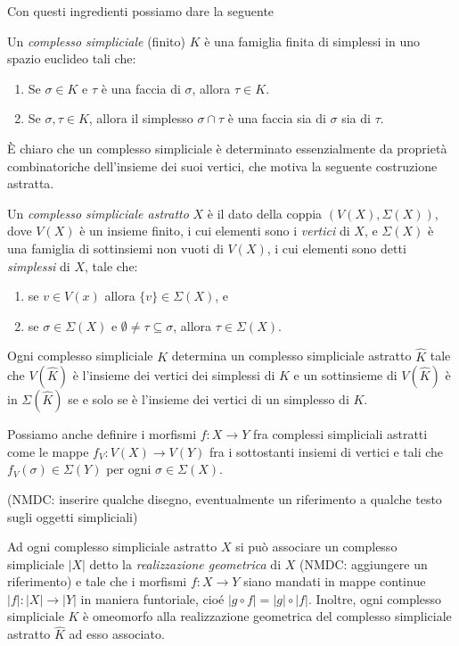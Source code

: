 Con questi ingredienti possiamo dare la seguente
\begin{defn}
Un \emph{complesso simpliciale} (finito) $K$ è una famiglia finita di simplessi in uno spazio euclideo tali che:
\begin{enumerate}
  \item Se $\sigma\in K$ e $\tau$ è una faccia di $\sigma$, allora $\tau \in K$.
  \item Se $\sigma,\tau\in K$, allora il simplesso $\sigma\cap\tau$ è una faccia sia di $\sigma$ sia di $\tau$.
\end{enumerate}
\end{defn}

\`E chiaro che un complesso simpliciale è determinato essenzialmente da proprietà combinatoriche dell'insieme dei suoi vertici, che motiva la seguente costruzione astratta.

\begin{defn}
  Un \emph{complesso simpliciale astratto} $X$ è il dato della coppia $(V(X), \Sigma(X))$, dove $V(X)$ è un insieme finito, i cui elementi sono i \emph{vertici} di $X$, e $\Sigma(X)$ è una famiglia di sottinsiemi non vuoti di $V(X)$, i cui elementi sono detti \emph{simplessi} di $X$, tale che:
  \begin{enumerate}
    \item se $v\in V(x)$ allora $\{v\}\in\Sigma(X)$, e
    \item se $\sigma \in \Sigma(X)$ e $\emptyset\neq\tau\subseteq\sigma$, allora $\tau\in\Sigma(X)$.
  \end{enumerate}
\end{defn}

\begin{rmk}
  Ogni complesso simpliciale $K$ determina un complesso simpliciale astratto $\widehat{K}$ tale che $V(\widehat{K})$ è l'insieme dei vertici dei simplessi di $K$ e un sottinsieme di $V(\widehat{K})$ è in $\Sigma(\widehat{K})$ se e solo se è l'insieme dei vertici di un simplesso di $K$.
\end{rmk}

Possiamo anche definire i morfismi $f:X\to Y$ fra complessi simpliciali astratti come le mappe $f_V:V(X)\to V(Y)$ fra i sottostanti insiemi di vertici e tali che $f_V(\sigma)\in \Sigma(Y)$ per ogni $\sigma \in \Sigma(X)$.

(NMDC: inserire qualche disegno, eventualmente un riferimento a qualche testo sugli oggetti simpliciali)

Ad ogni complesso simpliciale astratto $X$ si può associare un complesso simpliciale $|X|$ detto la \emph{realizzazione geometrica} di $X$ (NMDC: aggiungere un riferimento) e tale che i morfismi $f:X\to Y$ siano mandati in mappe continue $|f|:|X|\to |Y|$ in maniera funtoriale, cioé $|g\circ f|=|g|\circ |f|$. Inoltre, ogni complesso simpliciale $K$ è omeomorfo alla realizzazione geometrica del complesso simpliciale astratto $\widehat{K}$ ad esso associato.

